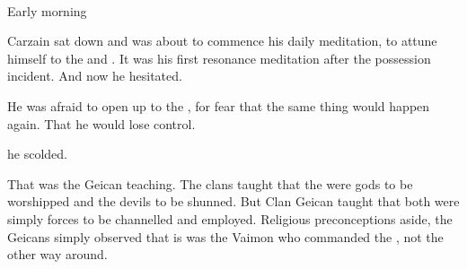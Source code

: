 
\begin{comment}
\section{Pre-\Bryndwin}
\end{comment}
\begin{comment}
\subsection{Meditation}
\end{comment}
\stamp{\dateDayAfterMutiny}
  { \\
   Early morning}



Carzain sat down and was about to commence his daily  meditation, to attune himself to the \sephiroth{} and \qliphoth. 
It was his first resonance meditation after the possession incident. 
And now he hesitated. 


He was afraid to open up to the \qliphoth{}, for fear that the same thing would happen again. 
That he would lose control. 

 he scolded.

That was the Geican teaching. 
The \Iquinian{} clans taught that the \sephiroth{} were gods to be worshipped and the \qliphoth{} devils to be shunned. 
But Clan Geican taught that both were simply forces to be channelled and employed. 
Religious preconceptions aside, the Geicans simply observed that is was the Vaimon who commanded the \Archon, not the other way around. 

